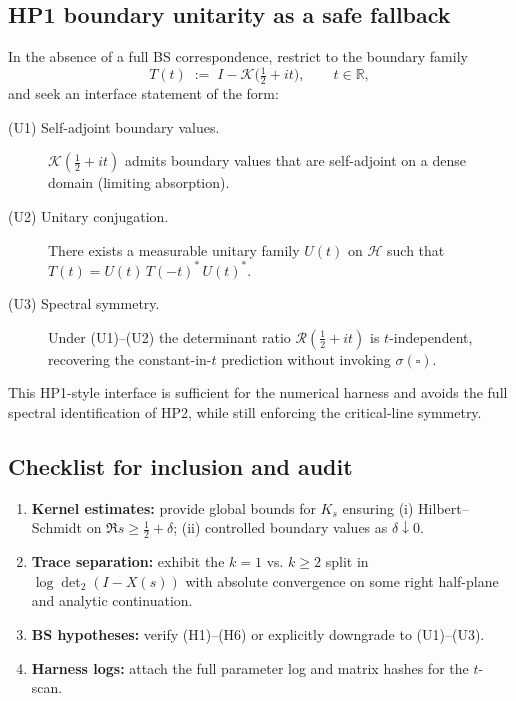 \subsection{HP1 boundary unitarity as a safe fallback}


In the absence of a full BS correspondence, restrict to the boundary family
\begin{equation}
T(t)\;:=\;I-\mathcal K\big(\tfrac12+it\big),\qquad t\in\mathbb R,
\end{equation}
and seek an interface statement of the form:
\begin{description}
\item[(U1) Self-adjoint boundary values.] $\mathcal K(\tfrac12+it)$ admits boundary values that are self-adjoint on a dense domain (limiting absorption).
\item[(U2) Unitary conjugation.] There exists a measurable unitary family $U(t)$ on $\mathscr H$ such that $T(t)=U(t)\,T(-t)^*\,U(t)^*$.
\item[(U3) Spectral symmetry.] Under (U1)–(U2) the determinant ratio $\mathcal R(\tfrac12+it)$ is $t$-independent, recovering the constant-in-$t$ prediction without invoking $\sigma(\square)$.
\end{description}
This HP1-style interface is sufficient for the numerical harness and avoids the full spectral identification of HP2, while still enforcing the critical-line symmetry.


\subsection{Checklist for inclusion and audit}


\begin{enumerate}
\item \textbf{Kernel estimates:} provide global bounds for $K_s$ ensuring (i) Hilbert–Schmidt on $\Re s\ge\tfrac12+\delta$; (ii) controlled boundary values as $\delta\downarrow0$.
\item \textbf{Trace separation:} exhibit the $k=1$ vs. $k\ge2$ split in $\log\det_2(I-X(s))$ with absolute convergence on some right half-plane and analytic continuation.
\item \textbf{BS hypotheses:} verify (H1)–(H6) or explicitly downgrade to (U1)–(U3).
\item \textbf{Harness logs:} attach the full parameter log and matrix hashes for the $t$-scan.
\end{enumerate}
\nocite{*}


